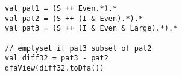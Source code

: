 \begin{lstlisting}[style=reclojureScala]
val pat1 = (S ++ Even.*).*
val pat2 = (S ++ (I & Even).*).*
val pat3 = (S ++ (I & Even & Large).*).*

// emptyset if pat3 subset of pat2
val diff32 = pat3 - pat2
dfaView(diff32.toDfa())
\end{lstlisting}

